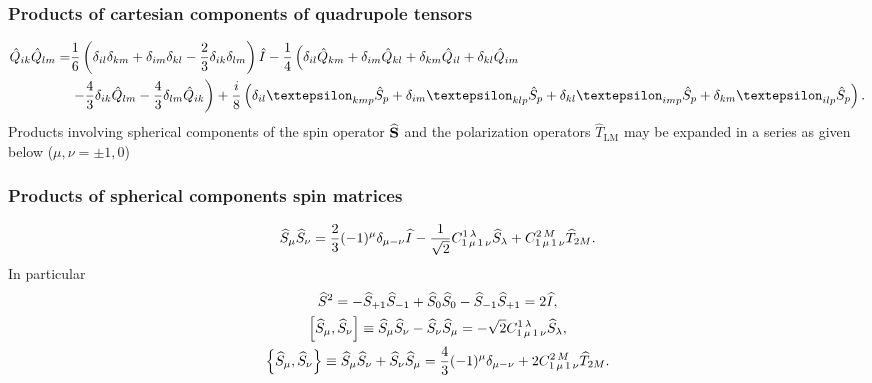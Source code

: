\subsubsection{Products of  cartesian components of quadrupole tensors}
\begin{align}
 \hat{Q}_{i k} \hat{Q}_{l m}=&\frac{1}{6}\left(\delta_{i l} \delta_{k m}+\delta_{i m} \delta_{k l}-\frac{2}{3} \delta_{i k} \delta_{l m}\right) \hat{I}-\frac{1}{4}\left(\delta_{i l} \hat{Q}_{k m}+\delta_{i m} \hat{Q}_{k l}+\delta_{k m} \hat{Q}_{i l}+\delta_{k l} \hat{Q}_{i m}\right.  \notag\\
& \left.-\frac{4}{3} \delta_{i k} \hat{Q}_{l m}-\frac{4}{3} \delta_{l m} \hat{Q}_{i k}\right)+\frac{i}{8}\left(\delta_{i l} \varepsilon_{k m p} \hat{S}_{p}+\delta_{i m} \varepsilon_{k l p} \hat{S}_{p}+\delta_{k l} \varepsilon_{i m p} \hat{S}_{p}+\delta_{k m} \varepsilon_{i l p} \hat{S}_{p}\right). \label{eq:2:6:54}
\end{align}
Products involving spherical components of the spin operator $\widehat{\mathbf{S}}$ and the polarization operators $\widehat{T}_{\mathrm{LM}}$ may be expanded in a series as given below ($\mu, \nu= \pm 1,0$)\\
\subsubsection{Products of spherical components spin matrices}
\begin{equation}
\widehat{S}_{\mu} \widehat{S}_{\nu}=\frac{2}{3}(-1)^{\mu} \delta_{\mu-\nu} \widehat{I}-\frac{1}{\sqrt{2}} C_{1\,\mu\,1\,\nu}^{1\,\lambda} \widehat{S}_{\lambda}+C_{1\,\mu\,1\,\nu}^{2\,M} \widehat{T}_{2 M}. \label{eq:2:6:55}
\end{equation}
In particular
\begin{gather}
\widehat{S}^{2}=-\widehat{S}_{+1} \widehat{S}_{-1}+\widehat{S}_{0} \widehat{S}_{0}-\widehat{S}_{-1} \widehat{S}_{+1}=2 \widehat{I},  \label{eq:2:6:56}\\
{\left[\widehat{S}_{\mu}, \widehat{S}_{\nu}\right] \equiv \widehat{S}_{\mu} \widehat{S}_{\nu}-\widehat{S}_{\nu} \widehat{S}_{\mu}=-\sqrt{2} C_{1\,\mu\,1\,\nu}^{1\,\lambda} \widehat{S}_{\lambda}} , \label{eq:2:6:57}\\
\left\{\widehat{S}_{\mu}, \widehat{S}_{\nu}\right\} \equiv \widehat{S}_{\mu} \widehat{S}_{\nu}+\widehat{S}_{\nu} \widehat{S}_{\mu}=\frac{4}{3}(-1)^{\mu} \delta_{\mu-\nu}+2 C_{1\,\mu\,1\,\nu}^{2\,M} \widehat{T}_{2 M}. \label{eq:2:6:58}
\end{gather}
